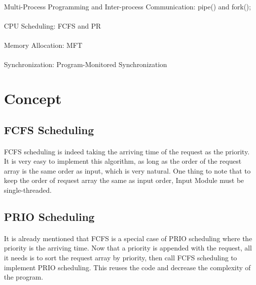 \documentclass{article}
\begin{document}
        \paragraph{}
        Multi-Process Programming and Inter-process Communication: pipe() and fork(); 
        \paragraph{}
        CPU Scheduling: FCFS and PR 
        \paragraph{}
        Memory Allocation: MFT
        \paragraph{}
        Synchronization: Program-Monitored Synchronization 
    \cleardoublepage
    \section{Concept}
        \subsection{FCFS Scheduling}
            \paragraph{}
                FCFS scheduling is indeed taking the arriving time of the request as the
                priority. It is very easy to implement this algorithm, as long as the
                order of the request array is the same order as input, which is very
                natural. One thing to note that to keep the order of request array the
                same as input order, Input Module must be single-threaded. 
        \subsection{PRIO Scheduling}
            \paragraph{}
            It is already mentioned that FCFS is a special case of PRIO scheduling where
            the priority is the arriving time. Now that a priority is appended with the
            request, all it needs is to sort the request array by priority, then call
            FCFS scheduling to implement PRIO scheduling. This reuses the code and
            decrease the complexity of the program. 
    \cleardoublepage
\end{document}
